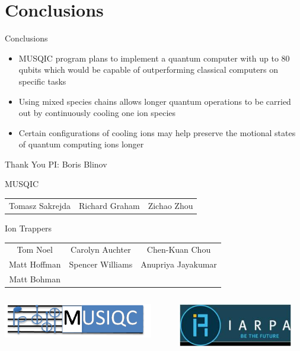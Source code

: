 \documentclass{beamer}
\begin{document}
\section[]{Conclusions}
\begin{frame}{Conclusions}
\begin{itemize}
	\item MUSQIC program plans to implement a quantum computer with up to 80 qubits which would be capable of outperforming classical computers on specific tasks
	\item Using mixed species chains allows longer quantum operations to be carried out by continuously cooling one ion species
	\item Certain configurations of cooling ions may help preserve the motional states of quantum computing ions longer
\end{itemize}
\end{frame}

\begin{frame}{Thank You}
PI: Boris Blinov
\begin{block}{MUSQIC}
\begin{tabular*}{0.9\textwidth}{ccc}
Tomasz Sakrejda & Richard Graham & Zichao Zhou \\
\end{tabular*}
\end{block}

\begin{block}{Ion Trappers}
\begin{tabular*}{0.9\textwidth}{ccc}
Tom Noel & Carolyn Auchter & Chen-Kuan Chou \\
Matt Hoffman & Spencer Williams & Anupriya Jayakumar \\
Matt Bohman
\end{tabular*}
\end{block}

\begin{columns}
\begin{column}{0.5\textwidth}
	\includegraphics[width=0.9\textwidth]{musiqc_logo}
\end{column}
\begin{column}{0.5\textwidth}
	\includegraphics[width=0.9\textwidth]{iarpa}
\end{column}
\end{columns}
\end{frame}
\end{document}
